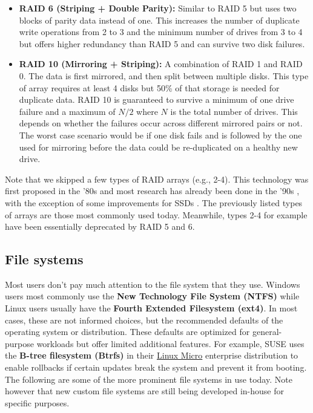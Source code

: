 \begin{itemize}
    \item \textbf{RAID 6 (Striping + Double Parity):} Similar to RAID 5 but uses
          two blocks of parity data instead of one. This increases the number
          of duplicate write operations from 2 to 3 and the minimum number of
          drives from 3 to 4 but offers higher redundancy than RAID 5 and can
          survive two disk failures.

    \item \textbf{RAID 10 (Mirroring + Striping):} A combination of RAID 1 and
          RAID 0. The data is first mirrored, and then split between multiple
          disks. This type of array requires at least 4 disks but 50\% of that
          storage is needed for duplicate data. RAID 10 is guaranteed to survive
          a minimum of one drive failure and a maximum of $N / 2$ where $N$ is
          the total number of drives. This depends on whether the failures
          occur across different mirrored pairs or not. The worst case scenario
          would be if one disk fails and is followed by the one used for
          mirroring before the data could be re-duplicated on a healthy new
          drive.
\end{itemize}

Note that we skipped a few types of RAID arrays (e.g., 2-4). This technology
was first proposed in the '80s and most research has already been done in the
'90s \cite{chen1994raid}, with the exception of some improvements for SSDs
\cite{balakrishnan2010differential}. The previously listed types of arrays are
those most commonly used today. Meanwhile, types 2-4 for example have been
essentially deprecated by RAID 5 and 6.

\subsection{File systems}

Most users don't pay much attention to the file system that they use. Windows
users most commonly use the \textbf{New Technology File System (NTFS)} while
Linux users usually have the \textbf{Fourth Extended Filesystem (ext4)}. In
most cases, these are not informed choices, but the recommended defaults of the
operating system or distribution. These defaults are optimized for
general-purpose workloads but offer limited additional features. For example,
SUSE uses the \textbf{B-tree filesystem (Btrfs)} in their
\href{https://links.imagerelay.com/cdn/3404/ql/ba9f00318526433b96c5f1f7a46fff8a/SLE-Micro-Data-Sheet.pdf}
{Linux Micro} enterprise distribution to enable rollbacks if certain updates
break the system and prevent it from booting. The following are some of the
more prominent file systems in use today. Note however that new custom file
systems are still being developed in-house for specific purposes.

